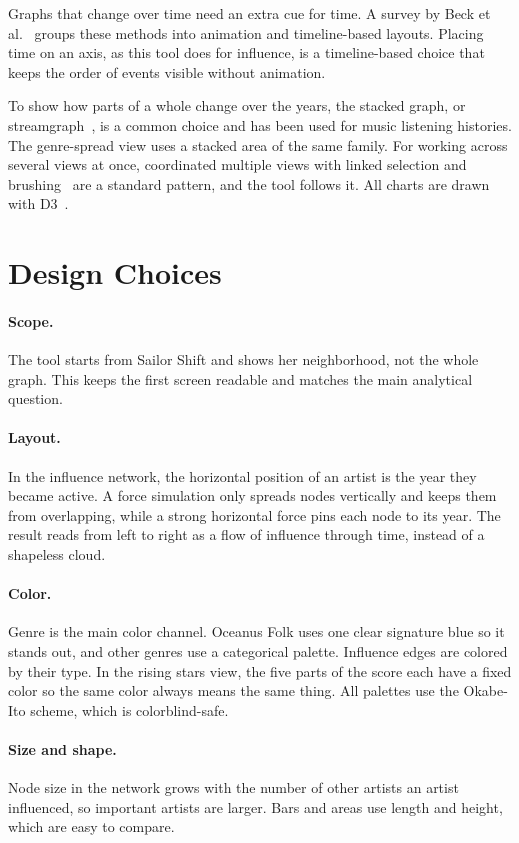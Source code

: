 \documentclass[11pt]{article}
\begin{document}
Graphs that change over time need an extra cue for time. A survey by Beck et
al.~\cite{dyngraph} groups these methods into animation and timeline-based layouts. Placing
time on an axis, as this tool does for influence, is a timeline-based choice that keeps the
order of events visible without animation.

To show how parts of a whole change over the years, the stacked graph, or
streamgraph~\cite{stackedgraphs}, is a common choice and has been used for music listening
histories. The genre-spread view uses a stacked area of the same family. For working
across several views at once, coordinated multiple views with linked selection and
brushing~\cite{cmv} are a standard pattern, and the tool follows it. All charts are drawn
with D3~\cite{d3}.

\section{Design Choices}
\paragraph{Scope.}
The tool starts from Sailor Shift and shows her neighborhood, not the whole graph. This
keeps the first screen readable and matches the main analytical question.

\paragraph{Layout.}
In the influence network, the horizontal position of an artist is the year they became
active. A force simulation only spreads nodes vertically and keeps them from overlapping,
while a strong horizontal force pins each node to its year. The result reads from left to
right as a flow of influence through time, instead of a shapeless cloud.

\paragraph{Color.}
Genre is the main color channel. Oceanus Folk uses one clear signature blue so it stands out, and
other genres use a categorical palette. Influence edges are colored by their type. In the rising
stars view, the five parts of the score each have a fixed color so the same color always
means the same thing. All palettes use the Okabe-Ito scheme, which is colorblind-safe.

\paragraph{Size and shape.}
Node size in the network grows with the number of other artists an artist influenced, so
important artists are larger. Bars and areas use length and height, which are easy to
compare.
\end{document}
